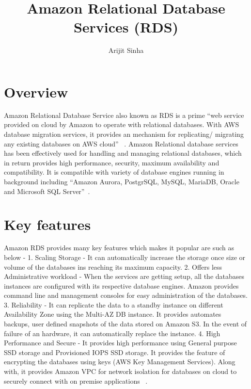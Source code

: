 
\title{Amazon Relational Database Services (RDS)}


\author{Arijit Sinha}


\renewcommand{\shortauthors}{A.Sinha}


\maketitle

\section{Overview}

Amazon Relational Database Service also known as RDS is a prime ``web service 
provided on cloud by Amazon to operate with relational databases. 
With AWS database migration services, it provides an mechanism for 
replicating/ migrating any existing databases on AWS cloud''
~\cite{hid-sp18-520-amazonrds}.
Amazon Relational database services has been effectively used for  handling
and managing relational databases, which in return provides high performance, 
security, maximum availability and compatibility. 
It is compatible with variety of database engines running in background 
including ``Amazon Aurora, PostgrSQL, MySQL, MariaDB, Oracle and 
Microsoft SQL Server''~\cite{hid-sp18-520-amazonrds}.

\section{Key features}

Amazon RDS provides many key features which makes it popular are such as below - 
1. Scaling Storage - It can automatically increase the storage once size or 
volume of the databases ins reaching its maximum capacity.
2. Offers less Administrative workload - When the services are getting setup, 
all the databases instances are configured with its respective database engines. 
Amazon provides command line and management consoles for easy administration 
of the databases.
3. Reliability - It can replicate the data to a standby instance on different 
Availability Zone using the Multi-AZ DB instance. It provides  automates backups, 
user defined snapshots of the data stored on Amazon S3. In the event of failure 
of an hardware, it can automatically replace the instance.
4. High Performance and Secure - It provides high performance using General 
purpose SSD storage and Provisioned IOPS SSD storage. It provides the feature of 
encrypting the databases using keys (AWS Key Management Services). Along with, it 
provides Amazon VPC for network isolation for databases on cloud to securely 
connect with on premise applications
~\cite{hid-sp18-520-amazonrds}.
 

